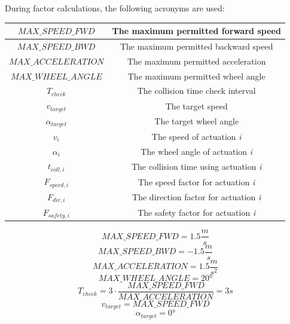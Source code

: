 \begin{minipage}{\textwidth}
During factor calculations, the following acronyms are used:

\begin{center}
    \begin{tabular}{ | c | c | }
        \hline
        $MAX\_SPEED\_FWD$    & The maximum permitted forward speed               \\
        \hline
        $MAX\_SPEED\_BWD$    & The maximum permitted backward speed              \\
        \hline
        $MAX\_ACCELERATION$  & The maximum permitted acceleration                \\
        \hline
        $MAX\_WHEEL\_ANGLE$  & The maximum permitted wheel angle                 \\
        \hline
        $T_{check}$          & The collision time check interval                 \\
        \hline
        $v_{target}$         & The target speed                                  \\
        \hline
        $\alpha_{target}$    & The target wheel angle                            \\
        \hline
        $v_{i}$              & The speed of actuation \textit{i}                 \\
        \hline
        $\alpha_{i}$         & The wheel angle of actuation \textit{i}           \\
        \hline
        $t_{coll,i}$         & The collision time using actuation \textit{i}     \\
        \hline
        $F_{speed,i}$        & The speed factor for actuation \textit{i}         \\
        \hline
        $F_{dir,i}$          & The direction factor for actuation \textit{i}     \\
        \hline
        $F_{safety,i}$       & The safety factor for actuation \textit{i}        \\
        \hline
    \end{tabular}
\end{center}
\end{minipage}

\begin{minipage}{\textwidth}
\[ MAX\_SPEED\_FWD = 1.5 \frac{m}{s} \]
\[ MAX\_SPEED\_BWD = -1.5 \frac{m}{s} \]
\[ MAX\_ACCELERATION = 1.5 \frac{m}{s^2} \]
\[ MAX\_WHEEL\_ANGLE = 20° \]
\[ T_{check} = 3 \cdot \frac{MAX\_SPEED\_FWD}{MAX\_ACCELERATION} = 3 s \]
\[ v_{target} = MAX\_SPEED\_FWD \]
\[ \alpha_{target} = 0° \]
\end{minipage}

